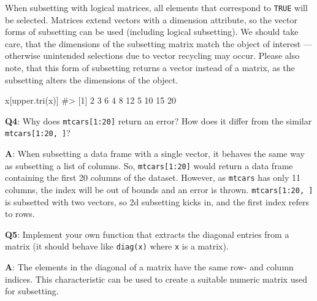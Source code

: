 \documentclass[
]{krantz}
\makeatletter
\newenvironment{Shaded}{\begin{snugshade}}{\end{snugshade}}
\newcommand{\CommentTok}[1]{\textcolor[rgb]{0.56,0.35,0.01}{\textit{#1}}}
\newcommand{\KeywordTok}[1]{\textcolor[rgb]{0.13,0.29,0.53}{\textbf{#1}}}
\newcommand{\NormalTok}[1]{#1}
\newenvironment{kframe}{%
\medskip{}
\setlength{\fboxsep}{.8em}
 \def\at@end@of@kframe{}%
 \ifinner\ifhmode%
  \def\at@end@of@kframe{\end{minipage}}%
  \begin{minipage}{\columnwidth}%
 \fi\fi%
 \def\FrameCommand##1{\hskip\@totalleftmargin \hskip-\fboxsep
 \colorbox{shadecolor}{##1}\hskip-\fboxsep
     \hskip-\linewidth \hskip-\@totalleftmargin \hskip\columnwidth}%
 \MakeFramed {\advance\hsize-\width
   \@totalleftmargin\z@ \linewidth\hsize
   \@setminipage}}%
 {\par\unskip\endMakeFramed%
 \at@end@of@kframe}
\renewenvironment{Shaded}{\begin{kframe}}{\end{kframe}}
\renewcommand{\KeywordTok} [1]{\textcolor[rgb]{0.00,0.44,0.13}{{#1}}}
\renewcommand{\CommentTok} [1]{\textcolor[rgb]{0.38,0.63,0.69}{{#1}}}
\renewcommand{\NormalTok}  [1]{{#1}}
\makeatother
\begin{document}
When subsetting with logical matrices, all elements that correspond to \texttt{TRUE} will be selected. Matrices extend vectors with a dimension attribute, so the vector forms of subsetting can be used (including logical subsetting). We should take care, that the dimensions of the subsetting matrix match the object of interest --- otherwise unintended selections due to vector recycling may occur. Please also note, that this form of subsetting returns a vector instead of a matrix, as the subsetting alters the dimensions of the object.

\begin{Shaded}
\begin{Highlighting}[]
\NormalTok{x[}\KeywordTok{upper.tri}\NormalTok{(x)]}
\CommentTok{#>  [1]  2  3  6  4  8 12  5 10 15 20}
\end{Highlighting}
\end{Shaded}

\textbf{{Q4}}: Why does \texttt{mtcars{[}1:20{]}} return an error? How does it differ from the similar \texttt{mtcars{[}1:20,\ {]}}?

\textbf{{A}}: When subsetting a data frame with a single vector, it behaves the same way as subsetting a list of columns. So, \texttt{mtcars{[}1:20{]}} would return a data frame containing the first 20 columns of the dataset. However, as \texttt{mtcars} has only 11 columns, the index will be out of bounds and an error is thrown. \texttt{mtcars{[}1:20,\ {]}} is subsetted with two vectors, so 2d subsetting kicks in, and the first index refers to rows.

\textbf{{Q5}}: Implement your own function that extracts the diagonal entries from a matrix (it should behave like \texttt{diag(x)} where \texttt{x} is a matrix).

\textbf{{A}}: The elements in the diagonal of a matrix have the same row- and column indices. This characteristic can be used to create a suitable numeric matrix used for subsetting.
\end{document}
